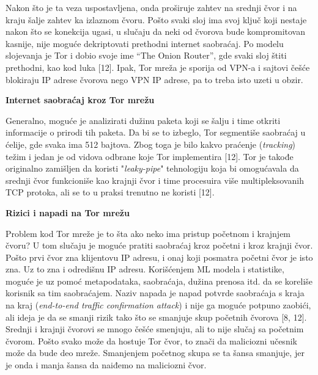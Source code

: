 \documentclass[
]{article}
\begin{document}
Nakon što je ta veza uspostavljena, onda proširuje zahtev na srednji
čvor i na kraju šalje zahtev ka izlaznom čvoru. Pošto svaki sloj ima
svoj ključ koji nestaje nakon što se konekcija ugasi, u
slučaju da neki od čvorova bude kompromitovan kasnije, nije moguće
dekriptovati prethodni internet saobraćaj. Po modelu slojevanja je
Tor i dobio svoje ime ``The Onion Router'', gde svaki sloj štiti
prethodni, kao kod luka [12]. Ipak, Tor mreža je sporija od VPN-a i
sajtovi češće blokiraju IP adrese čvorova nego VPN IP adrese, pa to
treba isto uzeti u obzir.

\textbf{Internet saobraćaj kroz Tor mrežu}

Generalno, moguće je analizirati dužinu paketa koji se šalju i time
otkriti informacije o prirodi tih paketa. Da bi se to izbeglo, Tor
segmentiše saobraćaj u ćelije, gde svaka ima 512 bajtova. Zbog toga je bilo
kakvo praćenje (\emph{tracking}) težim i jedan je od vidova odbrane koje Tor
implementira [12]. Tor je takođe originalno zamišljen da koristi
"\emph{leaky-pipe}" tehnologiju koja bi omogućavala da srednji čvor funkcioniše
kao krajnji čvor i time procesuira više multipleksovanih TCP protoka,
ali se to u praksi trenutno ne koristi [12].

\textbf{Rizici i napadi na Tor mrežu}

Problem kod Tor mreže
je to šta ako neko ima pristup početnom i krajnjem čvoru? U tom slučaju
je moguće pratiti saobraćaj kroz početni i kroz krajnji čvor. Pošto prvi
čvor zna klijentovu IP adresu, i onaj koji posmatra početni čvor
je isto zna. Uz to zna i odredišnu IP adresu. Korišćenjem ML modela i
statistike, moguće je uz pomoć metapodataka, saobraćaja, dužina prenosa
itd. da se koreliše korisnik sa tim saobraćajem. Naziv napada je
napad potvrde saobraćaja s kraja na kraj (\emph{end-to-end traffic confirmation attack})
i nije ga moguće potpuno
zaobići, ali ideja je da se smanji rizik tako što se smanjuje skup
početnih čvorova [8, 12]. Srednji i krajnji čvorovi se mnogo češće
smenjuju, ali to nije slučaj sa početnim čvorom. Pošto svako može da
hostuje Tor čvor, to znači da maliciozni učesnik može da bude deo mreže.
Smanjenjem početnog skupa se ta šansa smanjuje, jer je onda i manja
šansa da naiđemo na maliciozni čvor.
\end{document}
